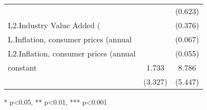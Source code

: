 \begin{table}[htbp]
\begin{tabular}{lcc}
                    &               &     (0.623)   \\
L2.Industry Value Added (%
                    &               &     (0.376)   \\
L.Inflation, consumer prices (annual %
                    &               &     (0.067)   \\
L2.Inflation, consumer prices (annual %
                    &               &     (0.055)   \\
constant            &       1.733   &       8.786   \\
                    &     (3.327)   &     (5.447)   \\
\end{tabular}\end{table}
* p<0.05, ** p<0.01, *** p<0.001
